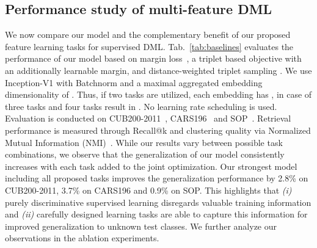 \documentclass[runningheads]{llncs}
\begin{document}
  
\subsection{Performance study of multi-feature DML}\label{sec:perf_study}
We now compare our model and the complementary benefit of our proposed feature learning tasks for supervised DML. Tab.~\ref{tab:baselines} evaluates the performance of our model based on margin loss~\cite{margin}, a triplet based objective with an additionally learnable margin, and distance-weighted triplet sampling \cite{margin}. We use Inception-V1 with Batchnorm and a maximal aggregated embedding dimensionality of . Thus, if two tasks are utilized, each embedding has , in case of three tasks  and four tasks result in . No learning rate scheduling is used. Evaluation is conducted on CUB200-2011~\cite{cub200-2011}, CARS196~\cite{cars196} and SOP~\cite{lifted}. Retrieval performance is measured through Recall@k\cite{recall} and clustering quality via Normalized Mutual Information (NMI)~\cite{nmi}. While our results vary between possible task combinations, we observe that the generalization of our model consistently increases with each task added to the joint optimization. Our strongest model including all proposed tasks improves the generalization performance by 2.8\% on CUB200-2011, 3.7\% on CARS196 and 0.9\% on SOP. This highlights that \textit{(i)} purely discriminative supervised learning disregards valuable training information and \textit{(ii)} carefully designed learning tasks are able to capture this information for improved generalization to unknown test classes. We further analyze our observations in the ablation experiments.
\end{document}
